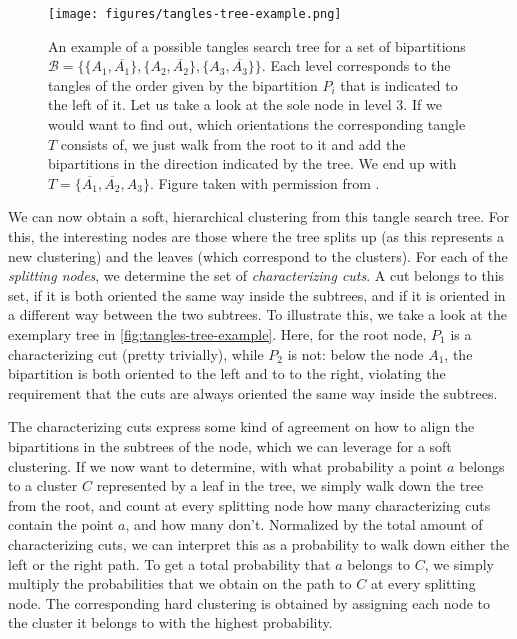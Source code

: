 \begin{figure}[h]
    \centering
    \texttt{[image: figures/tangles-tree-example.png]}
    \caption{An example of a possible tangles search tree for a set of bipartitions $\mathcal{B} = \{\{A_1, \overline{A_1}\}, \{A_2, \overline{A_2}\}, \{A_3, \overline{A_3}\} \}$. 
        Each level corresponds to the tangles of the order given by the bipartition $P_i$ that is indicated to the left of it.
        Let us take a look at the sole node in level 3. If we would want to find out, which orientations the corresponding tangle $T$ consists of, we just walk from
        the root to it and add the bipartitions in the direction indicated by the tree. We end up with $T = \{\overline{A_1}, \overline{A_2}, A_3\}$. 
        Figure taken with permission from \cite{klepperClusteringTanglesAlgorithmic2021}.}
    \label{fig:tangles-tree-example}
\end{figure}

We can now obtain a soft, hierarchical clustering from this tangle search tree. For this, the interesting nodes are those
where the tree splits up (as this represents a new clustering) and the leaves (which correspond to the clusters). 
For each of the \textit{splitting nodes}, we determine the set of \textit{characterizing cuts}.
A cut belongs to this set, if it is both oriented the same way inside the subtrees, and if it is oriented in a different way between the two subtrees.
To illustrate this, we take a look at the exemplary tree in \autoref{fig:tangles-tree-example}. Here, for the root node, $P_1$ is a characterizing cut (pretty trivially),
while $P_2$ is not: below the node $A_1$, the bipartition is both oriented to the left and to to the right, violating the requirement that the cuts are always oriented
the same way inside the subtrees. 

The characterizing cuts express some kind of agreement on how to align the bipartitions in the subtrees of the node, which we can leverage 
for a soft clustering. If we now want to determine, with what probability a point $a$ belongs to a cluster $C$ represented by a leaf in the tree, we simply walk down 
the tree from the root, and count at every splitting node how many characterizing cuts contain the point $a$, and how many don't. Normalized by the total amount of
characterizing cuts, we can interpret this as a probability to walk down either the left or the right path. To get a total probability that $a$ belongs to $C$, 
we simply multiply the probabilities that we obtain on the path to $C$ at every splitting node. The corresponding hard clustering is obtained by assigning each
node to the cluster it belongs to with the highest probability.
    
